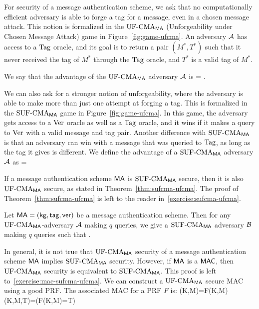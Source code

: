 For security of a message authentication scheme, we ask that no computationally efficient adversary is able to forge a tag for a message, even in a chosen message attack. This notion is formalized in the $\textnormal{UF-CMA}_{\mathsf{MA}}$ (Unforgeability under Chosen Message Attack) game in Figure~\ref{fig:game-ufcma}. An adversary ${\mathcal A}$ has access to a $\textnormal{Tag}$ oracle, and its goal is to return a pair $(M^*,T^*)$ such that it never received the tag of $M^*$ through the $\textnormal{Tag}$ oracle, and $T^*$ is a valid tag of $M^*$. 

We say that the advantage of the $\textnormal{UF-CMA}_{\mathsf{MA}}$ adversary ${\mathcal A}$ is 
\bnm
  \AdvUFCMA{\MA}{\advA} = .
\enm

We can also ask for a stronger notion of unforgeability, where the adversary is able to make more than just one attempt at forging a tag. This is formalized in the $\textnormal{SUF-CMA}_{\mathsf{MA}}$ game in Figure~\ref{fig:game-ufcma}. In this game, the adversary gets access to a $\textnormal{Ver}$ oracle as well as a $\textnormal{Tag}$ oracle, and it wins if it makes a query to $\textnormal{Ver}$ with a valid message and tag pair. Another difference with $\textnormal{SUF-CMA}_{\mathsf{MA}}$ is that an adversary can win with a message that was queried to $\textnormal{Tag}$, as long as the tag it gives is different. We define the advantage of a $\textnormal{SUF-CMA}_{\mathsf{MA}}$ adversary ${\mathcal A}$ as 
\bnm
  \AdvSUFCMA{\MA}{\advA} =  
\enm

If a message authentication scheme $\mathsf{MA}$ is $\textnormal{SUF-CMA}_{\mathsf{MA}}$ secure, then it is also $\textnormal{UF-CMA}_{\mathsf{MA}}$ secure, as stated in Theorem~\ref{thm:sufcma-ufcma}. The proof of Theorem~\ref{thm:sufcma-ufcma} is left to the reader in~\ref{exercise:sufcma-ufcma}.
\begin{theorem}
	\label{thm:sufcma-ufcma}
Let $\mathsf{MA} = ({\sf kg},\mathsf{tag},\mathsf{ver})$ be a message authentication scheme. Then for any $\textnormal{UF-CMA}_{\mathsf{MA}}$-adversary ${\mathcal A}$ making $q$ queries, we give a $\textnormal{SUF-CMA}_{\mathsf{MA}}$ adversary ${\mathcal B}$ making $q$ queries such that
\bnm
	\AdvUFCMA{\MA}{\advA} \le \AdvSUFCMA{\MA}{\advB} \;.
\enm
\end{theorem}

In general, it is not true that $\textnormal{UF-CMA}_{\mathsf{MA}}$ security of a message authentication scheme $\mathsf{MA}$ implies $\textnormal{SUF-CMA}_{\mathsf{MA}}$ security. However, if $\mathsf{MA}$ is a $\mathsf{MAC}$, then $\textnormal{UF-CMA}_{\mathsf{MA}}$ security is equivalent to $\textnormal{SUF-CMA}_{\mathsf{MA}}$. This proof is left to~\ref{exercise:mac-sufcma-ufcma}.
We can construct a $\textnormal{UF-CMA}_{\mathsf{MA}}$ secure MAC using a good PRF. The associated MAC for a PRF $F$ is:
\bnm
\mtag(K,M)=F(K,M)\myInd\myInd \ver(K,M,T)=(F(K,M)=T)
\enm

